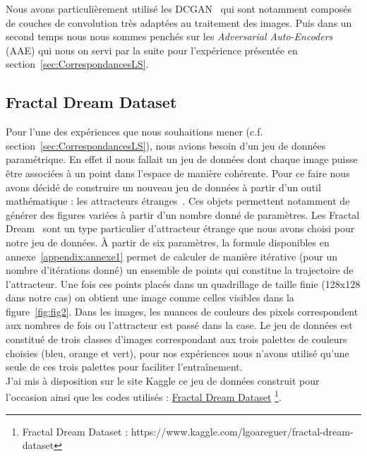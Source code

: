 \documentclass[11pt,francais]{article}
\begin{document}
Nous avons particulièrement utilisé les DCGAN~\cite{radford2015unsupervised} qui sont notamment composés de couches de convolution très adaptées au traitement des images. Puis dans un second temps nous nous sommes penchés sur les \textit{Adversarial Auto-Encoders} (AAE) qui nous on servi par la suite pour l'expérience présentée en section~\ref{sec:CorrespondancesLS}.

\subsection{Fractal Dream Dataset}
\label{sec:FDD}
Pour l'une des expériences que nous souhaitions mener (c.f. section~\ref{sec:CorrespondancesLS}), nous avions besoin d'un jeu de données paramétrique. 
En effet il nous fallait un jeu de données dont chaque image puisse être associées à un point dans l'espace de manière cohérente. 
Pour ce faire nous avons décidé de construire un nouveau jeu de données à partir d'un outil mathématique : les attracteurs étranges~\cite{Pickover}. Ces objets permettent notamment de générer des figures variées à partir d'un nombre donné de paramètres.
Les Fractal Dream~\cite{Pickover} sont un type particulier d'attracteur étrange que nous avons choisi pour notre jeu de données. À partir de six paramètres, la formule disponibles en annexe~\ref{appendix:annexe1} permet de calculer de manière itérative (pour un nombre d'itérations donné) un ensemble de points qui constitue la trajectoire de l'attracteur. Une fois ces points placés dans un quadrillage de taille finie (128x128 dans notre cas) on obtient une image comme celles visibles dans la figure~\ref{fig:fig2}. Dans les images, les nuances de couleurs des pixels correspondent aux nombres de fois ou l'attracteur est passé dans la case. 
Le jeu de données est constitué de trois classes d'images correspondant aux trois palettes de couleurs choisies (bleu, orange et vert), pour nos expériences nous n'avons utilisé qu'une seule de ces trois palettes pour faciliter l'entraînement.\\
J'ai mis à disposition sur le site Kaggle ce jeu de données construit pour l'occasion ainsi que les codes utilisés : \href{https://www.kaggle.com/lgoareguer/fractal-dream-dataset}{Fractal Dream Dataset} \footnote{\label{note3}Fractal Dream Dataset : https://www.kaggle.com/lgoareguer/fractal-dream-dataset}.
\end{document}
